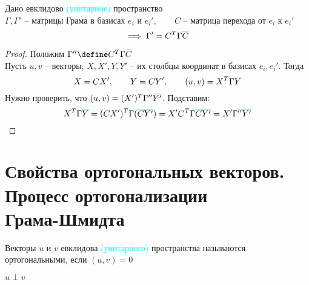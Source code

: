 \begin{theorem}
	Дано евклидово \textcolor{cyan}{(унитарное)} пространство \\
	$ \Gamma, \Gamma' $ -- матрицы Грама в базисах $ e_i $ и $ e_i', \qquad C $ -- матрица перехода от $ e_i $ к $ e_i' $
	$$ \implies \Gamma' = C^T\Gamma\color{cyan}\overline{\color{black}C} $$
\end{theorem}

\begin{proof}
	Положим $ \Gamma'' \define C^T\Gamma\color{cyan}\overline{\color{black}C} $ \\
	Пусть $ u, v $ -- векторы, $ X, X', Y, Y' $ -- их столбцы координат в базисах $ e_i, e_i' $. Тогда
	$$ X = CX', \qquad Y = CY', \qquad (u, v) = X^T\Gamma\color{cyan}\overline{\color{black}Y} $$
	Нужно проверить, что $ (u, v) = (X')^T\Gamma''\color{cyan}\overline{\color{black}Y'} $. Подставим:
	$$ X^T\Gamma\color{cyan}\overline{\color{black}Y}\color{black} = (CX')^T\Gamma(\color{cyan}\overline{\color{black}CY'}\color{black}) = X'C^T\Gamma\color{cyan}\overline{\color{black}CY'}\color{black} = X'\Gamma''\color{cyan}\overline{\color{black}Y'}\color{black} $$
\end{proof}

\section{Свойства ортогональных векторов. Процесс ортогонализации \texorpdfstring{\\}{} Грама-Шмидта}

\begin{definition}
	Векторы $ u $ и $ v $ евклидова \textcolor{cyan}{(унитарного)} пространства называются ортогональными, если $ (u, v) = 0 $
\end{definition}

\begin{notation}
	$ u \perp v $
\end{notation}

